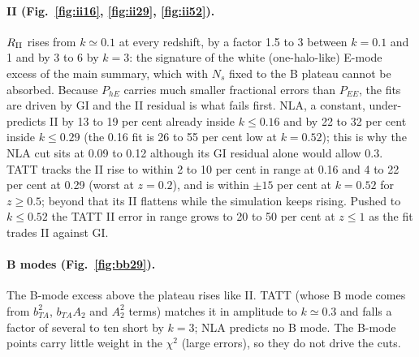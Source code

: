 \documentclass[11pt]{article}
\begin{document}
\paragraph{II (Fig.~\ref{fig:ii16}, \ref{fig:ii29}, \ref{fig:ii52}).}
$R_{\rm II}$ rises from $k \simeq 0.1$ at every redshift, by a factor 1.5 to 3
between $k = 0.1$ and 1 and by 3 to 6 by $k = 3$: the signature of the
white (one-halo-like) E-mode excess of the main summary, which with $N_s$
fixed to the B plateau cannot be absorbed. Because $P_{hE}$ carries much
smaller fractional errors than $P_{EE}$, the fits are driven by GI and the II
residual is what fails first. NLA, a constant, under-predicts II by 13 to 19
per cent already inside $k \le 0.16$ and by 22 to 32 per cent inside
$k \le 0.29$ (the 0.16 fit is 26 to 55 per cent low at $k = 0.52$); this is
why the NLA cut sits at 0.09 to 0.12 although its GI residual alone would
allow 0.3. TATT tracks the II rise to within 2 to 10 per cent in range at
0.16 and 4 to 22 per cent at 0.29 (worst at $z = 0.2$), and is within
$\pm 15$ per cent at $k = 0.52$ for $z \ge 0.5$; beyond that its II flattens
while the simulation keeps rising. Pushed to $k \le 0.52$ the TATT II error in
range grows to 20 to 50 per cent at $z \le 1$ as the fit trades II against GI.

\paragraph{B modes (Fig.~\ref{fig:bb29}).} The B-mode excess above the
plateau rises like II. TATT (whose B mode comes from $b_{TA}^2$, $b_{TA}A_2$ and
$A_2^2$ terms) matches it in amplitude to $k \simeq 0.3$ and falls a factor
of several to ten short by $k = 3$; NLA predicts no B mode. The B-mode points carry
little weight in the $\chi^2$ (large errors), so they do not drive the cuts.
\end{document}
